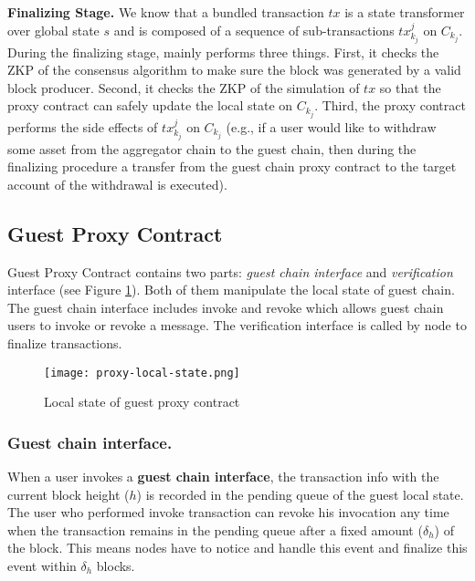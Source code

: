 \smallskip\noindent\textbf{Finalizing Stage.}
We know that a bundled transaction $tx$ is a state transformer over global state $s$ and is composed of a sequence of sub-transactions $tx^j_{k_j}$ on $C_{k_j}$. During the finalizing stage, \dprotocol mainly performs three things. First, it checks the ZKP of the consensus algorithm to make sure the block was generated by a valid block producer. Second, it checks the ZKP of the simulation of $tx$ so that the proxy contract can safely update the local state on $C_{k_j}$. Third, the proxy contract performs the side effects of $tx^j_{k_j}$ on $C_{k_j}$ (e.g., if a user would like to withdraw some asset from the aggregator chain to the guest chain, then during the finalizing procedure a transfer from the guest chain proxy contract to the target account of the withdrawal is executed).

\subsection{Guest Proxy Contract}
Guest Proxy Contract contains two parts: \emph{guest chain interface} and \emph{verification} interface (see Figure \ref{local-state}). Both of them manipulate the local state of guest chain. The guest chain interface includes invoke and revoke which allows guest chain users to invoke or revoke a message. The verification interface is called by \dprotocol node to finalize transactions.

\begin{figure}[!ht]
\texttt{[image: proxy-local-state.png]}
\caption{Local state of guest proxy contract}
\label{local-state}
\end{figure}

\subsubsection*{Guest chain interface.}
When a user invokes a {\bf guest chain interface}, the transaction info with the current block height ($h$) is recorded in the pending queue of the guest local state. The user who performed invoke transaction can revoke his invocation any time when the transaction remains in the pending queue after a fixed amount ($\delta_h$) of the block. This means \dprotocol nodes have to notice and handle this event and finalize this event within $\delta_h$ blocks.


